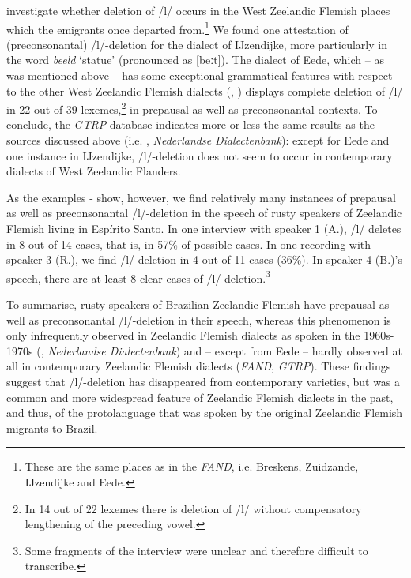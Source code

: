 \documentclass[output=paper,hidelinks,draftmode]{langscibook}
\begin{document}
investigate whether deletion of /l/ occurs in the West Zeelandic Flemish places which the emigrants once departed from.\footnote{ {These are the same places as in the} {\textit{FAND}}{, i.e. Breskens, Zuidzande, IJzendijke and Eede.}} We found one attestation of (preconsonantal) /l/-deletion for the dialect of IJzendijke, more particularly in the word \textit{beeld} ‘statue’ (pronounced as [beːt]). The dialect of Eede, which – as was mentioned above – has some exceptional grammatical features with respect to the other West Zeelandic Flemish dialects (\citealt[20--25]{BroeckedeMan1978}, \citealt{Rys1999}) displays complete deletion of /l/ in 22 out of 39 lexemes,\footnote{In 14 out of 22 lexemes there is deletion of /l/ without compensatory lengthening of the preceding vowel.} in prepausal as well as preconsonantal contexts. To conclude, the \textit{GTRP}-database indicates more or less the same results as the sources discussed above (i.e. \citealt{BroeckedeMan1978, Taeldeman1979, DeWulfTaeldeman2005}, \textit{Nederlandse Dialectenbank}): except for Eede and one instance in IJzendijke, /l/-deletion does not seem to occur in contemporary dialects of West Zeelandic Flanders.

As the examples - show, however, we find relatively many instances of prepausal as well as preconsonantal /l/-deletion in the speech of rusty speakers of Zeelandic Flemish living in Espírito Santo. In one interview with speaker 1 (A.), /l/ deletes in 8 out of 14 cases, that is, in 57\% of possible cases. In one recording with speaker 3 (R.), we find /l/-deletion in 4 out of 11 cases (36\%). In speaker 4 (B.)'s speech, there are at least 8 clear cases of /l/-deletion.\footnote{Some fragments of the interview were unclear and therefore difficult to transcribe.}

To summarise, rusty speakers of Brazilian Zeelandic Flemish have prepausal as well as preconsonantal /l/-deletion in their speech, whereas this phenomenon is only infrequently observed in Zeelandic Flemish dialects as spoken in the 1960s-1970s (\citealt{BroeckedeMan1978}, \textit{Nederlandse Dialectenbank}) and – except from Eede – hardly observed at all in contemporary Zeelandic Flemish dialects (\textit{FAND}, \textit{GTRP}). These findings suggest that /l/-deletion has disappeared from contemporary varieties, but was a common and more widespread feature of Zeelandic Flemish dialects in the past, and thus, of the protolanguage that was spoken by the original Zeelandic Flemish migrants to Brazil. 
\end{document}
